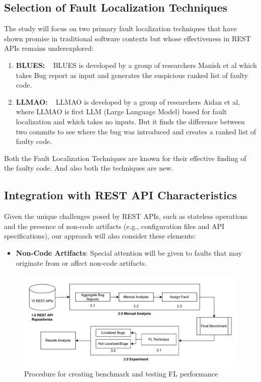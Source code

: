 \documentclass[conference]{IEEEtran}
\begin{document}
\subsection{Selection of Fault Localization Techniques}

The study will focus on two primary fault localization techniques that have shown promise in traditional software contexts but whose effectiveness in REST APIs remains underexplored:
\begin{enumerate}
    \item \textbf{BLUES:} ~\cite{ManishBluesFaultLocalization} BLUES is developed by a group of researchers Manish et al which takes Bug report as input and generates the suspicious ranked list of faulty code.
    \item \textbf{LLMAO:} ~\cite{LLMAOFaultLocalization} LLMAO is developed by a group of researchers Aidan et al, where LLMAO is first LLM (Large Language Model) based for fault localization and which takes no inputs. But it finds the difference between two commits to see where the bug was introduced and creates a ranked list of faulty code. 

\end{enumerate}

Both the Fault Localization Techniques are known for their effective finding of the faulty code. And also both the techniques are new.

\subsection{Integration with REST API Characteristics}

Given the unique challenges posed by REST APIs, such as stateless operations and the presence of non-code artifacts (e.g., configuration files and API specifications), our approach will also consider these elements:
\begin{itemize}
    \item \textbf{Non-Code Artifacts}: Special attention will be given to faults that may originate from or affect non-code artifacts. 
\end{itemize}


\begin{figure}[htbp]
    \centering
    \includegraphics[width=\textwidth]{Paper/fig2.png}
    \caption{Procedure for creating benchmark and testing FL performance}
\end{figure}
\end{document}
